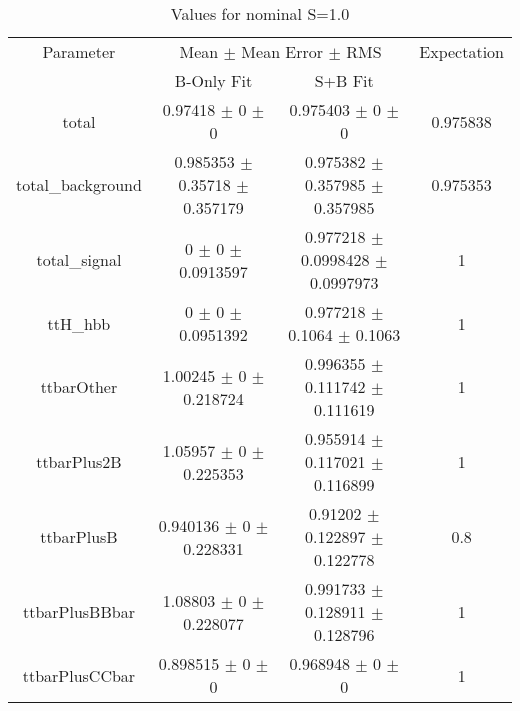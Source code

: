 \begin{table}
\centering
\caption{Values for nominal S=1.0}
\begin{tabular}{cccc}
\toprule
Parameter & \multicolumn{2}{c}{Mean $\pm$ Mean Error $\pm$ RMS} & Expectation\\
 & B-Only Fit & S+B Fit & \\
\midrule
total & \num{0.97418} $\pm$ \num{0} $\pm$ \num{0} & \num{0.975403} $\pm$ \num{0} $\pm$ \num{0} & \num{0.975838}\\
total\_background & \num{0.985353} $\pm$ \num{0.35718} $\pm$ \num{0.357179} & \num{0.975382} $\pm$ \num{0.357985} $\pm$ \num{0.357985} & \num{0.975353}\\
total\_signal & \num{0} $\pm$ \num{0} $\pm$ \num{0.0913597} & \num{0.977218} $\pm$ \num{0.0998428} $\pm$ \num{0.0997973} & \num{1}\\
ttH\_hbb & \num{0} $\pm$ \num{0} $\pm$ \num{0.0951392} & \num{0.977218} $\pm$ \num{0.1064} $\pm$ \num{0.1063} & \num{1}\\
ttbarOther & \num{1.00245} $\pm$ \num{0} $\pm$ \num{0.218724} & \num{0.996355} $\pm$ \num{0.111742} $\pm$ \num{0.111619} & \num{1}\\
ttbarPlus2B & \num{1.05957} $\pm$ \num{0} $\pm$ \num{0.225353} & \num{0.955914} $\pm$ \num{0.117021} $\pm$ \num{0.116899} & \num{1}\\
ttbarPlusB & \num{0.940136} $\pm$ \num{0} $\pm$ \num{0.228331} & \num{0.91202} $\pm$ \num{0.122897} $\pm$ \num{0.122778} & \num{0.8}\\
ttbarPlusBBbar & \num{1.08803} $\pm$ \num{0} $\pm$ \num{0.228077} & \num{0.991733} $\pm$ \num{0.128911} $\pm$ \num{0.128796} & \num{1}\\
ttbarPlusCCbar & \num{0.898515} $\pm$ \num{0} $\pm$ \num{0} & \num{0.968948} $\pm$ \num{0} $\pm$ \num{0} & \num{1}\\
\bottomrule
\end{tabular}
\end{table}